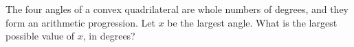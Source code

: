 The four angles of a convex quadrilateral are whole numbers of degrees, and they form an arithmetic progression. Let $x$ be the largest angle. What is the largest possible value of $x$, in degrees?
